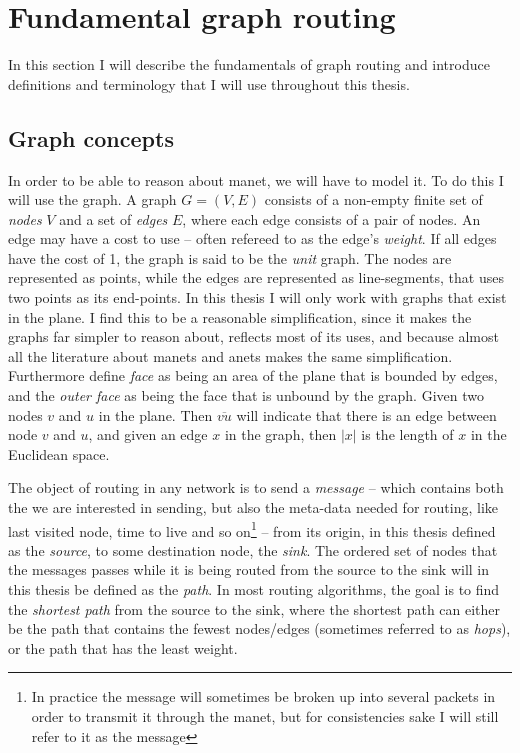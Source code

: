 \section{Fundamental graph routing}
\label{section:fundamental_graph_routing}
In this section I will describe the fundamentals of graph routing and introduce definitions and terminology that I will use throughout this thesis.

\subsection{Graph concepts}
\label{section:graph_concepts}
In order to be able to reason about \ac{manet}, we will have to model it. To do this I will use the graph. A graph $G = (V, E)$ consists of a non-empty finite set of \emph{nodes} $V$ and a set of \emph{edges} $E$, where each edge consists of a pair of nodes. An edge may have a cost to use -- often refereed to as the edge's \emph{weight}. If all edges have the cost of 1, the graph is said to be the \emph{unit} graph. The nodes are represented as points, while the edges are represented as line-segments, that uses two points as its end-points. In this thesis I will only work with graphs that exist in the plane. I find this to be a reasonable simplification, since it makes the graphs far simpler to reason about, reflects most of its uses, and because almost all the literature about \acp{manet} and \acp{anet} makes the same simplification. Furthermore define \emph{face} as being an area of the plane that is bounded by edges, and the \emph{outer face} as being the face that is unbound by the graph. Given two nodes $v$ and $u$ in the plane. Then $\overline{vu}$ will indicate that there is an edge between node $v$ and $u$, and given an edge $x$ in the graph, then $|x|$ is the length of $x$ in the Euclidean space.

The object of routing in any network is to send a \emph{message} -- which contains both the we are interested in sending, but also the meta-data needed for routing, like last visited node, time to live and so on\footnote{In practice the message will sometimes be broken up into several packets in order to transmit it through the \ac{manet}, but for consistencies sake I will still refer to it as the message} -- from its origin, in this thesis defined as the \emph{source}, to some destination node, the \emph{sink}. The ordered set of nodes that the messages passes while it is being routed from the source to the sink will in this thesis be defined as the \emph{path}. In most routing algorithms, the goal is to find the \emph{shortest path} from the source to the sink, where the shortest path can either be the path that contains the fewest nodes/edges (sometimes referred to as \emph{hops}), or the path that has the least weight.

